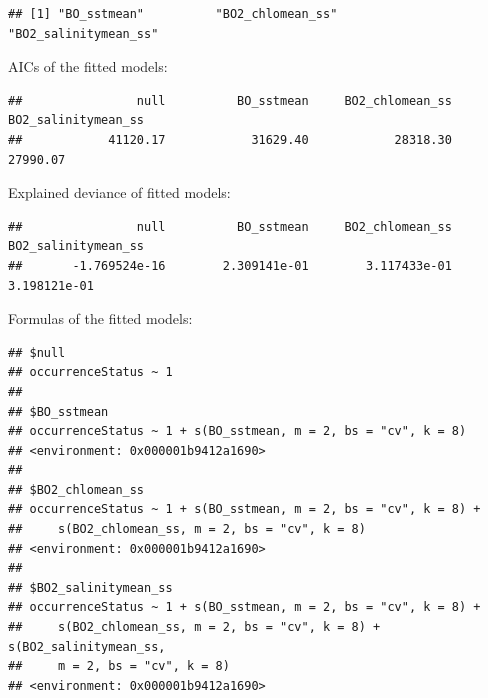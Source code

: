 \documentclass[
]{book}
\newenvironment{Shaded}{\begin{snugshade}}{\end{snugshade}}
\newcommand{\ControlFlowTok}[1]{\textcolor[rgb]{0.13,0.29,0.53}{\textbf{#1}}}
\newcommand{\FunctionTok}[1]{\textcolor[rgb]{0.13,0.29,0.53}{\textbf{#1}}}
\newcommand{\NormalTok}[1]{#1}
\newcommand{\SpecialCharTok}[1]{\textcolor[rgb]{0.81,0.36,0.00}{\textbf{#1}}}
\begin{document}
\begin{verbatim}
## [1] "BO_sstmean"          "BO2_chlomean_ss"     "BO2_salinitymean_ss"
\end{verbatim}

AICs of the fitted models:

\begin{Shaded}
\end{Shaded}

\begin{verbatim}
##                null          BO_sstmean     BO2_chlomean_ss BO2_salinitymean_ss 
##            41120.17            31629.40            28318.30            27990.07
\end{verbatim}

Explained deviance of fitted models:

\begin{Shaded}
\end{Shaded}

\begin{verbatim}
##                null          BO_sstmean     BO2_chlomean_ss BO2_salinitymean_ss 
##       -1.769524e-16        2.309141e-01        3.117433e-01        3.198121e-01
\end{verbatim}

Formulas of the fitted models:

\begin{Shaded}
\end{Shaded}

\begin{verbatim}
## $null
## occurrenceStatus ~ 1
## 
## $BO_sstmean
## occurrenceStatus ~ 1 + s(BO_sstmean, m = 2, bs = "cv", k = 8)
## <environment: 0x000001b9412a1690>
## 
## $BO2_chlomean_ss
## occurrenceStatus ~ 1 + s(BO_sstmean, m = 2, bs = "cv", k = 8) + 
##     s(BO2_chlomean_ss, m = 2, bs = "cv", k = 8)
## <environment: 0x000001b9412a1690>
## 
## $BO2_salinitymean_ss
## occurrenceStatus ~ 1 + s(BO_sstmean, m = 2, bs = "cv", k = 8) + 
##     s(BO2_chlomean_ss, m = 2, bs = "cv", k = 8) + s(BO2_salinitymean_ss, 
##     m = 2, bs = "cv", k = 8)
## <environment: 0x000001b9412a1690>
\end{verbatim}
\end{document}
